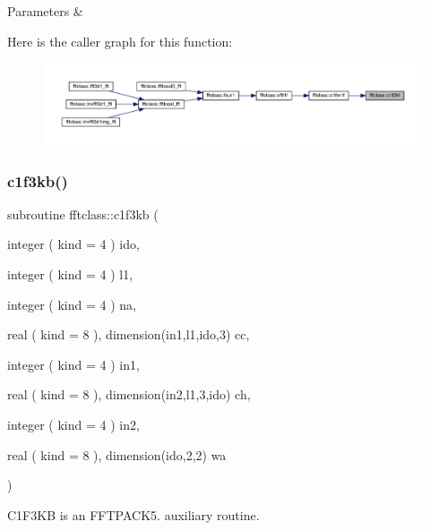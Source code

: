 \begin{DoxyParams}{Parameters}
{\em } & \\
\hline
\end{DoxyParams}
Here is the caller graph for this function\+:\nopagebreak
\begin{figure}[H]
\begin{center}
\leavevmode
\includegraphics[width=350pt]{namespacefftclass_a0535bb9fc14fda824be9053638cdfb2a_icgraph}
\end{center}
\end{figure}
\mbox{\label{namespacefftclass_af43eb54e0a7553e31585e67ad240b860}} 
\subsubsection{\texorpdfstring{c1f3kb()}{c1f3kb()}}
{\footnotesize\ttfamily subroutine fftclass\+::c1f3kb (\begin{DoxyParamCaption}\item[{integer ( kind = 4 )}]{ido,  }\item[{integer ( kind = 4 )}]{l1,  }\item[{integer ( kind = 4 )}]{na,  }\item[{real ( kind = 8 ), dimension(in1,l1,ido,3)}]{cc,  }\item[{integer ( kind = 4 )}]{in1,  }\item[{real ( kind = 8 ), dimension(in2,l1,3,ido)}]{ch,  }\item[{integer ( kind = 4 )}]{in2,  }\item[{real ( kind = 8 ), dimension(ido,2,2)}]{wa }\end{DoxyParamCaption})}



C1\+F3\+KB is an F\+F\+T\+P\+A\+C\+K5. auxiliary routine. 

